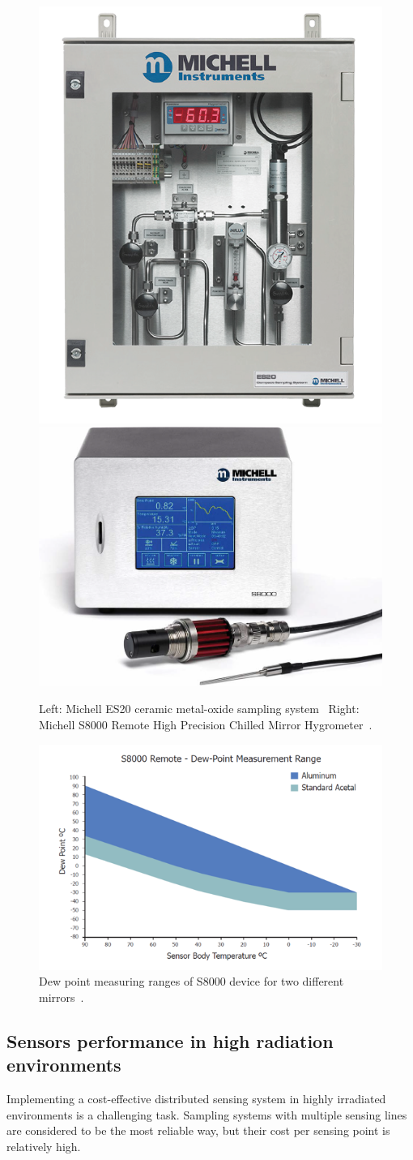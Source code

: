 \begin{figure}[!h]
\centering
\includegraphics[width=0.35\columnwidth]{Chapter5/images/ES20.png}
\includegraphics[width=0.4\columnwidth]{Chapter5/images/s8000.png}
\caption{Left: Michell ES20 ceramic metal-oxide sampling system~\cite{michell_e20}
Right: Michell S8000 Remote High Precision Chilled Mirror Hygrometer~\cite{michell_s8000}.}
\label{fig:sniffer}
\end{figure}


\begin{figure}[!h]
\centering
\includegraphics[width=0.65\columnwidth]{Chapter5/images/s8000_remote.png}
\caption{Dew point measuring ranges of S8000 device for two different mirrors~\cite{michell_s8000}.}
\label{fig:fos_mirror}
\end{figure}
\newpage
\subsection{Sensors performance in high radiation environments}
\label{fos_irrad}
Implementing a cost-effective distributed sensing system in highly irradiated environments is a challenging task. Sampling systems with multiple sensing lines are considered to be the most reliable way, but their cost per sensing point is relatively high. 

